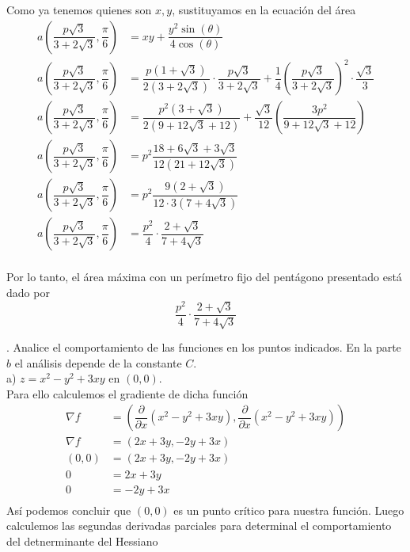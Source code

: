 \documentclass[letterpaper]{article}
\renewcommand{\d}{\partial}
\renewcommand{\*}{\cdot}
\theoremstyle{definition}
\begin{document}
Como ya tenemos quienes son $ x,y $, sustituyamos en la ecuación del área
\begin{align*}
	a\left( \dfrac{p\sqrt{3}}{3 + 2\sqrt{3}},\dfrac{\pi}{6}\right) &= xy + \dfrac{y^2\sin(\theta)}{4\cos(\theta)} \\
	a\left( \dfrac{p\sqrt{3}}{3 + 2\sqrt{3}},\dfrac{\pi}{6}\right) &= \dfrac{p(1 + \sqrt{3})}{2(3 + 2\sqrt{3})}\* \dfrac{p\sqrt{3}}{3 + 2\sqrt{3}} + \dfrac{1}{4}\left(\dfrac{p\sqrt{3}}{3 + 2\sqrt{3}}\right)^2\* \dfrac{\sqrt{3}}{3}\\
	a\left( \dfrac{p\sqrt{3}}{3 + 2\sqrt{3}},\dfrac{\pi}{6}\right) &= \dfrac{p^2 (3 + \sqrt{3})}{2(9 + 12\sqrt{3}+ 12)} + \dfrac{\sqrt{3}}{12}\left( \dfrac{3 p^2}{9 + 12\sqrt{3} + 12} \right)\\
	a\left( \dfrac{p\sqrt{3}}{3 + 2\sqrt{3}},\dfrac{\pi}{6}\right) &= p^2\dfrac{ 18 + 6\sqrt{3} +3 \sqrt{3} }{12(21 + 12\sqrt{3})} \\
	a\left( \dfrac{p\sqrt{3}}{3 + 2\sqrt{3}},\dfrac{\pi}{6}\right) &= p^2\dfrac{ 9 (2 +\sqrt{3})}{12 \* 3 (7 + 4\sqrt{3})} \\
	a\left( \dfrac{p\sqrt{3}}{3 + 2\sqrt{3}},\dfrac{\pi}{6}\right) &= \dfrac{p^2}{4}\*\dfrac{2 + \sqrt{3} }{7 + 4\sqrt{3}} \\
\end{align*}
\begin{center}
	Por lo tanto, el área máxima con un perímetro fijo del pentágono presentado está dado por \[\dfrac{p^2}{4}\*\dfrac{2 + \sqrt{3} }{7 + 4\sqrt{3}}   \]
\end{center}
. Analice el comportamiento de las funciones en los puntos indicados. En la parte $b$ el análisis depende de la constante $C$.\\

a) $z = x^2 - y^2 + 3xy $ en $(0,0)$.\\

Para ello calculemos el gradiente de dicha función
\begin{align*}
	\nabla f &= \left( \dfrac{\d }{\d x} (x^2 - y^2 + 3xy),\dfrac{\d }{\d x}   (x^2 - y^2 + 3xy) \right) \\
	\nabla f &= \left( 2x + 3y, -2y + 3x\right) \\
	(0,0) &= \left( 2x + 3y, -2y + 3x\right) \\
	0 &=  2x + 3y \\
	0 &= -2y + 3x \\
\end{align*}
Así podemos concluir que $ (0,0) $ es un punto crítico para nuestra función. Luego calculemos las segundas derivadas parciales para determinal el comportamiento del detnerminante del Hessiano
\end{document}
